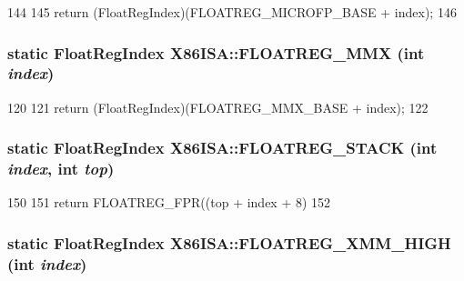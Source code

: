 \begin{DoxyCode}
144     {
145         return (FloatRegIndex)(FLOATREG_MICROFP_BASE + index);
146     }
\end{DoxyCode}
\hypertarget{namespaceX86ISA_a4fd5045f1ab1c921edbf999a7452de9c}{
\subsubsection[{FLOATREG\_\-MMX}]{\setlength{\rightskip}{0pt plus 5cm}static {\bf FloatRegIndex} X86ISA::FLOATREG\_\-MMX (int {\em index})}}
\label{namespaceX86ISA_a4fd5045f1ab1c921edbf999a7452de9c}



\begin{DoxyCode}
120     {
121         return (FloatRegIndex)(FLOATREG_MMX_BASE + index);
122     }
\end{DoxyCode}
\hypertarget{namespaceX86ISA_aa7d52d6d8aa711d769c4fbee2fcd578a}{
\subsubsection[{FLOATREG\_\-STACK}]{\setlength{\rightskip}{0pt plus 5cm}static {\bf FloatRegIndex} X86ISA::FLOATREG\_\-STACK (int {\em index}, \/  int {\em top})}}
\label{namespaceX86ISA_aa7d52d6d8aa711d769c4fbee2fcd578a}



\begin{DoxyCode}
150     {
151         return FLOATREG_FPR((top + index + 8) %
152     }
\end{DoxyCode}
\hypertarget{namespaceX86ISA_ac68f196980acc04ce2279fb376e1401b}{
\subsubsection[{FLOATREG\_\-XMM\_\-HIGH}]{\setlength{\rightskip}{0pt plus 5cm}static {\bf FloatRegIndex} X86ISA::FLOATREG\_\-XMM\_\-HIGH (int {\em index})}}
\label{namespaceX86ISA_ac68f196980acc04ce2279fb376e1401b}



